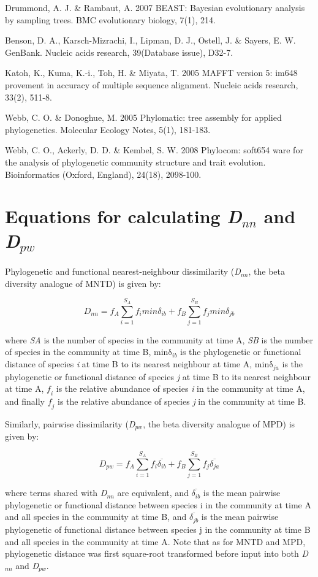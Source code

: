 Drummond, A. J. \& Rambaut, A. 2007 BEAST: Bayesian evolutionary analysis by sampling trees. BMC evolutionary biology, 7(1), 214.

Benson, D. A., Karsch-Mizrachi, I., Lipman, D. J., Ostell, J. \& Sayers, E. W.
GenBank. Nucleic acids research, 39(Database issue), D32-7.

Katoh, K., Kuma, K.-i., Toh, H. \& Miyata, T. 2005 MAFFT version 5: im648
provement in accuracy of multiple sequence alignment. Nucleic acids research,
33(2), 511-8.

Webb, C. O. \& Donoghue, M. 2005 Phylomatic: tree assembly for applied
phylogenetics. Molecular Ecology Notes, 5(1), 181-183.

Webb, C. O., Ackerly, D. D. \& Kembel, S. W. 2008 Phylocom: soft654
ware for the analysis of phylogenetic community structure and trait evolution. Bioinformatics (Oxford, England), 24(18), 2098-100.

\section{Equations for calculating \textit{D}$_{nn}$ and \textit{D}$_{pw}$}

Phylogenetic and functional nearest-neighbour dissimilarity (\textit{D}$_{nn}$, the beta diversity analogue of MNTD) is given by:

$$D_{nn} = f_{A}\sum_{i=1}^{S_{A}}f_{i} min \delta _{ib} + f_{B}\sum_{j=1}^{S_{B}}f_{j}min \delta _{jb}$$

where \textit{SA} is the number of species in the community at time A, \textit{SB} is the number of species in the community at time B, $\mathrm{min \delta _{\mathit{ib}}}$ is the phylogenetic or functional distance of species \textit{i} at time B to its nearest neighbour at time A, $\mathrm{min \delta _{\mathit{ja}}}$ is the phylogenetic or functional distance of species \textit{j} at time B to its nearest neighbour at time A, $\mathit{f_{i}}$  is the relative abundance of species \textit{i} in the community at time A, and finally $\mathit{f_{j}}$ is the relative abundance of species \textit{j} in the community at time B. 

Similarly, pairwise dissimilarity (\textit{D}$_{pw}$, the beta diversity analogue of MPD) is given by:

$$D_{pw} = f_{A}\sum_{i=1}^{S_{A}}f_{i}\overline{\delta _{ib}} + f_{B}\sum_{j=1}^{S_{B}}f_{j}\overline{\delta _{ja}}$$

where terms shared with \textit{D}$_{nn}$ are equivalent, and $\overline{\delta _{ib}}$ is the mean pairwise phylogenetic or functional distance between species i in the community at time A and all species in the community at time B, and $\overline{\delta _{jb}}$ is the mean pairwise phylogenetic of functional distance between species j in the community at time B and all species in the community at time A. Note that as for MNTD and MPD, phylogenetic distance was first square-root transformed before input into both \textit{D}$_{nn}$ and \textit{D}$_{pw}$.

